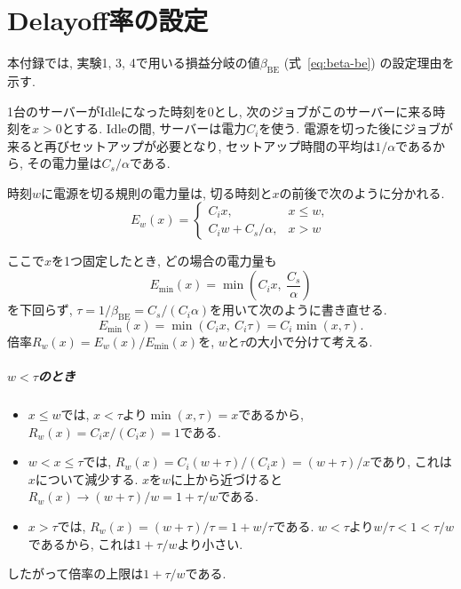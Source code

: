 \chapter{Delayoff率の設定}
\label{app:delayoff}

本付録では, 実験1, 3, 4で用いる損益分岐の値$\beta_{\mathrm{BE}}$ (式~\eqref{eq:beta-be}) の設定理由を示す.

1台のサーバーがIdleになった時刻を$0$とし, 次のジョブがこのサーバーに来る時刻を$x > 0$とする.
Idleの間, サーバーは電力$C_i$を使う. 電源を切った後にジョブが来ると再びセットアップが必要となり,
セットアップ時間の平均は$1/\alpha$であるから, その電力量は$C_s/\alpha$である.

時刻$w$に電源を切る規則の電力量は, 切る時刻と$x$の前後で次のように分かれる.
\begin{equation*}
    E_w(x) =
    \begin{cases}
        C_i x, & x \le w, \\
        C_i w + C_s/\alpha, & x > w
    \end{cases}
\end{equation*}

ここで$x$を1つ固定したとき, どの場合の電力量も
\begin{equation}
    E_{\min}(x) = \min\!\left(C_i x,\ \frac{C_s}{\alpha}\right)
    \label{eq:app-emin}
\end{equation}
を下回らず, $\tau = 1/\beta_{\mathrm{BE}} = C_s/(C_i\alpha)$を用いて次のように書き直せる.
\begin{equation*}
    E_{\min}(x) = \min(C_i x,\ C_i \tau) = C_i \min(x, \tau).
    \label{eq:app-emin-tau}
\end{equation*}
倍率$R_w(x) = E_w(x)/E_{\min}(x)$を, $w$と$\tau$の大小で分けて考える.

\paragraph{$w < \tau$のとき}
\begin{itemize}
    \item $x \le w$では, $x < \tau$より$\min(x, \tau) = x$であるから, $R_w(x) = C_i x / (C_i x) = 1$である.
    \item $w < x \le \tau$では, $R_w(x) = C_i(w+\tau)/(C_i x) = (w+\tau)/x$であり, これは$x$について減少する.
          $x$を$w$に上から近づけると$R_w(x) \to (w+\tau)/w = 1 + \tau/w$である.
    \item $x > \tau$では, $R_w(x) = (w+\tau)/\tau = 1 + w/\tau$である. $w < \tau$より$w/\tau < 1 < \tau/w$であるから, これは$1 + \tau/w$より小さい.
\end{itemize}
したがって倍率の上限は$1 + \tau/w$である.

